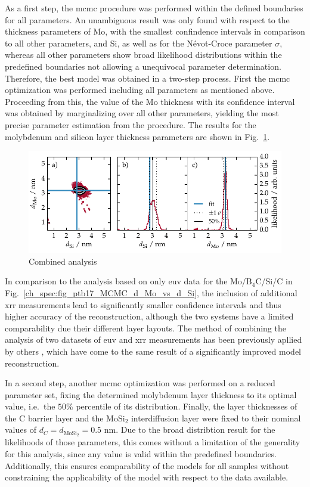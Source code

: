 As a first step, the \gls{mcmc} procedure was performed within the defined boundaries for all parameters. An unambiguous result was only found with respect to the thickness parameters of Mo, with the smallest confindence intervals in comparison to all other parameters, and Si, as well as for the N\'{e}vot-Croce parameter $\sigma$, whereas all other parameters show broad likelihood distributions within the predefined boundaries not allowing a unequivocal parameter determination. Therefore, the best model was obtained in a two-step process. First the \gls{mcmc} optimization was performed including all parameters as mentioned above. Proceeding from this, the value of the Mo thickness with its confidence interval was obtained by marginalizing over all other parameters, yielding the most precise parameter estimation from the procedure. The results for the molybdenum and silicon layer thickness parameters are shown in Fig.~\ref{ch_spec:fig_Mo_Si_C_d_Mo_vs_d_Si}.
\begin{figure}[htbp]
\centering
\includegraphics{img/Mo_Si_C_d_Mo_vs_d_Si}
\caption{Combined analysis}
\label{ch_spec:fig_Mo_Si_C_d_Mo_vs_d_Si}
\end{figure}
In comparison to the analysis based on only \gls{euv} data for the Mo/B$_4$C/Si/C in Fig.~\ref{ch_spec:fig_ptb17_MCMC_d_Mo_vs_d_Si}, the inclusion of additional \gls{xrr} measurements lead to significantly smaller confidence intervals and thus higher accuracy of the reconstruction, although the two systems have a limited comparability due their different layer layouts. The method of combining the analysis of two datasets of \gls{euv} and \gls{xrr} measurements has been previously apllied by others \cite{yakunin_combined_2014}, which have come to the same result of a significantly improved model reconstruction.

In a second step, another \gls{mcmc} optimization was performed on a reduced parameter set, fixing the determined molybdenum layer thickness to its optimal value, i.e.~the $50\%$ percentile of its distribution. Finally, the layer thicknesses of the C barrier layer and the MoSi$_2$ interdiffusion layer were fixed to their nominal values of $d_C = d_{\text{MoSi}_2} = 0.5 $ nm. Due to the broad distribtion result for the likelihoods of those parameters, this comes without a limitation of the generality for this analysis, since any value is valid within the predefined boundaries. Additionally, this ensures comparability of the models for all samples without constraining the applicability of the model with respect to the data available.

